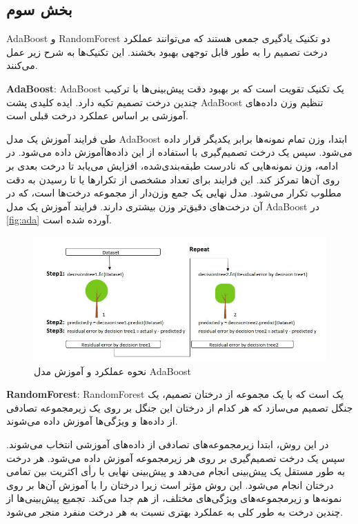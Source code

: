 \documentclass{article}
\begin{document}
\subsection{بخش سوم}
AdaBoost و RandomForest
 دو تکنیک یادگیری جمعی هستند که می‌توانند عملکرد درخت تصمیم را به طور قابل توجهی بهبود بخشند. این تکنیک‌ها به شرح زیر عمل می‌کنند.
 
{\large \textbf{AdaBoost}:} 
AdaBoost 
یک تکنیک تقویت است که بر بهبود دقت پیش‌بینی‌ها با ترکیب چندین درخت تصمیم تکیه دارد. ایده کلیدی پشت AdaBoost
 تنظیم وزن داده‌های آموزشی بر اساس عملکرد درخت قبلی است. 
 
طی فرایند آموزش یک مدل 
AdaBoost
 ابتدا، وزن‌ تمام نمونه‌ها برابر یکدیگر قرار داده می‌شود. سپس یک درخت تصمیم‌گیری با استفاده از این داده‌هاآموزش داده می‌شود. در ادامه، وزن نمونه‌هایی که نادرست طبقه‌بندی‌شده، افزایش می‌یابد تا درخت بعدی بر روی آن‌ها تمرکز کند. این فرایند برای تعداد مشخصی از تکرارها یا تا رسیدن به دقت مطلوب تکرار می‌شود. مدل نهایی یک جمع وزن‌دار از مجموعه درخت‌‌ها است، که در آن درخت‌های دقیق‌تر وزن بیشتری دارند. فرایند آموزش یک مدل AdaBoost در 
 \autoref{fig:ada}
 آورده شده است.
 
 
\begin{figure}[H]
\centering
\includegraphics[width=1\linewidth]{img/Q3/ada}
\caption{نحوه عملکرد و آموزش مدل AdaBoost \cite{towardsdatascience2020ensemblelearning}}
\label{fig:ada}
\end{figure}

{\large \textbf{RandomForest}:} 
RandomForest 
یک  است که با یک مجموعه از درختان تصمیم، یک جنگل تصمیم می‌سازد که هر کدام از درختان این جنگل بر روی یک زیرمجموعه تصادفی از داده‌ها و ویژگی‌ها آموزش داده می‌شوند. 

در این روش، ابتدا زیرمجموعه‌های تصادفی از داده‌های آموزشی انتخاب می‌شوند. سپس یک درخت تصمیم‌گیری بر روی هر زیرمجموعه آموزش داده می‌شود. هر درخت به طور مستقل یک پیش‌بینی انجام می‌دهد و پیش‌بینی نهایی با رأی اکثریت بین تمامی درختان انجام می‌شود. این روش مؤثر است زیرا درختان را با آموزش آن‌ها بر روی نمونه‌ها و زیرمجموعه‌های ویژگی‌های مختلف، از هم جدا می‌کند. تجمیع پیش‌بینی‌ها از چندین درخت به طور کلی به عملکرد بهتری نسبت به هر درخت منفرد منجر می‌شود.
\end{document}
